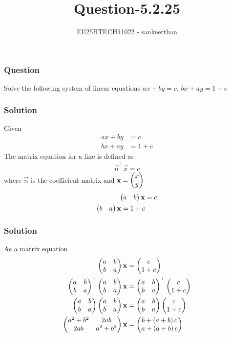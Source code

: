 \documentclass{beamer}
\title{Question-5.2.25}
\author{EE25BTECH11022 - sankeerthan}
\date{}
\begin{document}
\frame{\titlepage}

\begin{frame}
\frametitle{Question}
Solve the following system of linear equations $ax+by =c$, $bx+ay =1+c$
\end{frame}

\begin{frame}
\frametitle{Solution}
Given  
\begin{align}
ax+by &= c \\
bx+ay &=1+c 
\end{align}
The matrix equation for a line is defined as
\begin{align}
    \vec{n}^\top\vec{x}=c
\end{align}
where $\vec{n}$ is the coefficient matrix and $\mathbf{x}=\begin{pmatrix}x\\y\end{pmatrix}$
\begin{align}
       \begin{pmatrix}a & b\end{pmatrix}\mathbf{x}&=c \\ 
       \begin{pmatrix}b & a\end{pmatrix}\mathbf{x}=1+c
\end{align}
\end{frame}
\begin{frame}
\frametitle{Solution}
As a matrix equation
\begin{align}
\begin{pmatrix}a&b\\b&a\end{pmatrix}\mathbf{x}&=\begin{pmatrix}c \\ 1+c\end{pmatrix} \\
\begin{pmatrix}a&b\\b&a\end{pmatrix}^\top\begin{pmatrix}a&b\\b&a\end{pmatrix}\mathbf{x}&=\begin{pmatrix}a&b\\b&a\end{pmatrix}^\top\begin{pmatrix}c\\1+c\end{pmatrix} \\
\begin{pmatrix}a&b\\b&a\end{pmatrix}\begin{pmatrix}a&b\\b&a\end{pmatrix}\mathbf{x}&=\begin{pmatrix}a&b\\b&a\end{pmatrix}\begin{pmatrix}c\\1+c\end{pmatrix}   \\
\begin{pmatrix}a^2+b^2 & 2ab \\2ab & a^2+b^2\end{pmatrix}\mathbf{x}&=\begin{pmatrix}b+\left(a+b\right)c \\a+\left(a+b\right)c\end{pmatrix} 
\end{align}
\end{frame}
\end{document}
